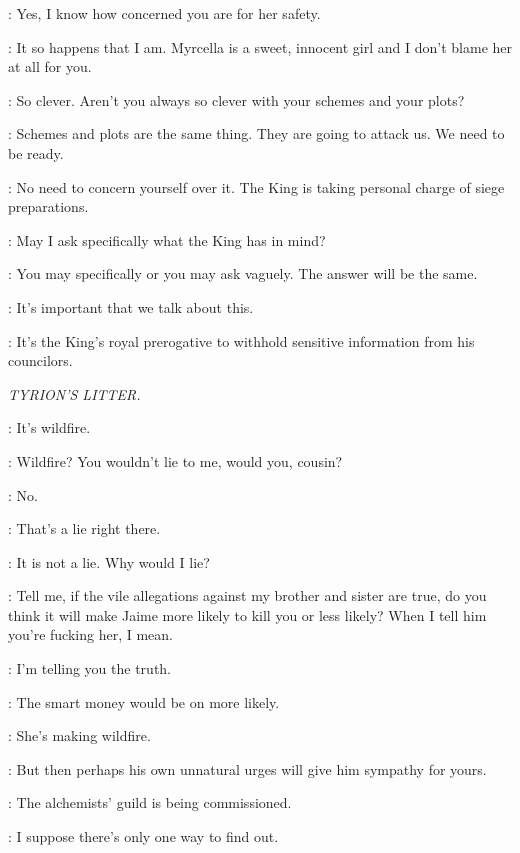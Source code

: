 \CERSEI: Yes, I know how concerned you are for her safety. 

\TYRION: It so happens that I am. Myrcella is a sweet, innocent girl and I don't blame her at all for you. 

\CERSEI: So clever. Aren't you always so clever with your schemes and your plots? 

\TYRION: Schemes and plots are the same thing. They are going to attack us. We need to be ready. 

\CERSEI: No need to concern yourself over it. The King is taking personal charge of siege preparations. 

\TYRION: May I ask specifically what the King has in mind? 

\CERSEI: You may specifically or you may ask vaguely. The answer will be the same. 

\TYRION: It's important that we talk about this. 

\CERSEI: It's the King's royal prerogative to withhold sensitive information from his councilors. 



\scene

\textit{TYRION'S LITTER.} 


\LANCEL: It's wildfire. 

\TYRION: Wildfire? You wouldn't lie to me, would you, cousin? 

\LANCEL: No. 

\TYRION: That's a lie right there. 

\LANCEL: It is not a lie. Why would I lie? 

\TYRION: Tell me, if the vile allegations against my brother and sister are true, do you think it will make Jaime more likely to kill you or less likely? When I tell him you're fucking her, I mean. 

\LANCEL: I'm telling you the truth. 

\TYRION: The smart money would be on more likely. 

\LANCEL: She's making wildfire. 

\TYRION: But then perhaps his own unnatural urges will give him sympathy for yours. 

\LANCEL: The alchemists' guild is being commissioned. 

\TYRION: I suppose there's only one way to find out. 

